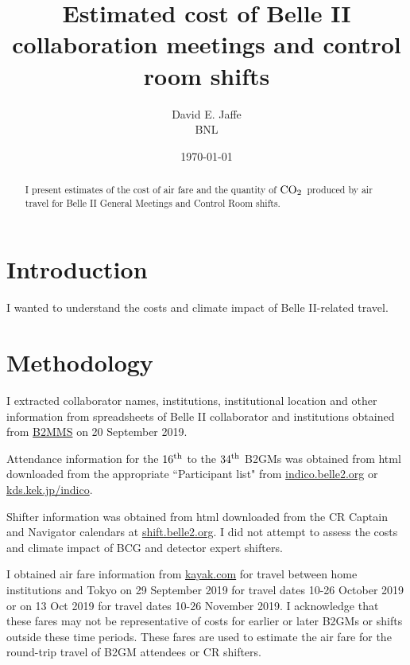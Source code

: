 \documentclass[12pt]{article}
\newcommand{\COtwo}{${\rm CO}_2$}
\begin{document}
\title{Estimated cost of Belle II collaboration meetings and control room shifts}

\author{David E. Jaffe \\ BNL}
\date{\today}
\maketitle
\begin{abstract}
{
I present estimates of the cost of air fare and the quantity of \COtwo\ produced by air travel for Belle II General Meetings and Control Room shifts. 
}
\end{abstract}


\onehalfspacing   %

\section{Introduction}

I wanted to understand the costs and climate impact of Belle II-related travel. 

\section{Methodology}

I extracted collaborator names, institutions, institutional location and other information from spreadsheets of Belle II collaborator and institutions obtained from \href{https://b2mms.belle2.org/pls/apex/f?p=1546:18:12868551837158:::::}{\color{blue}B2MMS} on 20 September 2019. 

Attendance information for the $16^{\rm th}$ to the $34^{\rm th}$ B2GMs was obtained from html downloaded from the appropriate ``Participant list" from \href{indico.belle2.org}{\color{blue} indico.belle2.org} or \href{kds.kek.jp/indico}{\color{blue}kds.kek.jp/indico}. 

 Shifter information was obtained from html downloaded from the CR Captain and Navigator calendars at \href{https://shift.belle2.org}{\color{blue}shift.belle2.org}. 
 I did not attempt to assess the costs and climate impact of BCG and detector expert shifters.
 
 I obtained air fare information from \href{kayak.com}{\color{blue}kayak.com} for travel between home institutions and Tokyo on 29 September 2019 for travel dates 10-26 October 2019 or on 13 Oct 2019 for travel dates 10-26 November 2019. 
 I acknowledge that these fares may not be representative of costs for earlier or later B2GMs or shifts outside these time periods. 
 These fares are used to estimate the air fare for the round-trip travel of B2GM attendees or CR shifters. 
 
\end{document}
